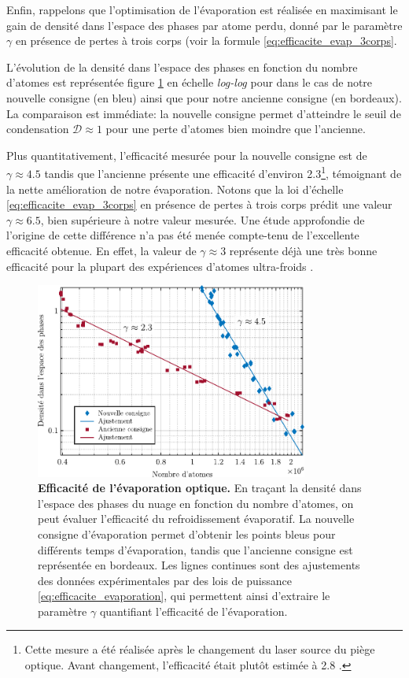 Enfin, rappelons que l'optimisation de l'évaporation est réalisée en maximisant le gain de densité dans l'espace des phases par atome perdu, donné par le paramètre $\gamma$ en présence de pertes à trois corps (voir la formule \ref{eq:efficacite_evap_3corps}. 

L'évolution de la densité dans l'espace des phases en fonction du nombre d'atomes est représentée figure \ref{fig:efficacite_evaporation_optique} en échelle \emph{log-log} pour dans le cas de notre nouvelle consigne (en bleu) ainsi que pour notre ancienne consigne (en bordeaux). La comparaison est immédiate: la nouvelle consigne permet d'atteindre le seuil de condensation $\mathcal{D}\approx 1$ pour une perte d'atomes bien moindre que l'ancienne.

Plus quantitativement, l'efficacité mesurée pour la nouvelle consigne est de $\gamma\approx 4.5$ tandis que l'ancienne présente une efficacité d'environ 2.3\footnote{Cette mesure a été réalisée après le changement du laser source du piège optique. Avant changement, l'efficacité était plutôt estimée à 2.8 \citep{jendrzejewski2012quantum}.}, témoignant de la nette amélioration de notre évaporation. Notons que la loi d'échelle \ref{eq:efficacite_evap_3corps} en présence de pertes à trois corps prédit une valeur $\gamma\approx 6.5$, bien supérieure à notre valeur mesurée. Une étude approfondie de l'origine de cette différence n'a pas été menée compte-tenu de l'excellente efficacité obtenue. En effet, la valeur de $\gamma\approx 3$ représente déjà une très bonne efficacité pour la plupart des expériences d'atomes ultra-froids \citep{barrett2001all}\citep{hung2008accelerating}.



\begin{figure}
\centering
\includegraphics[width=0.8\textwidth]{Fig/Modif_exp/efficacité_évaporation_optique.pdf}
\caption{\textbf{Efficacité de l'évaporation optique.} En traçant la densité dans l'espace des phases du nuage en fonction du nombre d'atomes, on peut évaluer l'efficacité du refroidissement évaporatif. La nouvelle consigne d'évaporation permet d'obtenir les points bleus pour différents temps d'évaporation, tandis que l'ancienne consigne est représentée en bordeaux. Les lignes continues sont des ajustements des données expérimentales par des lois de puissance \ref{eq:efficacite_evaporation}, qui permettent ainsi d'extraire le paramètre $\gamma$ quantifiant l'efficacité de l'évaporation.}
\label{fig:efficacite_evaporation_optique}
\end{figure}

